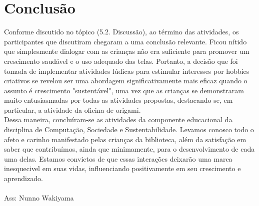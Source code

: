 \documentclass[a4paper,12pt]{article}
\begin{document}
\section{\LARGE{Conclusão}}
Conforme discutido no tópico (5.2. Discussão), ao término das atividades, os participantes que discutiram chegaram a uma conclusão relevante. Ficou nítido que simplesmente dialogar com as crianças não era suficiente para promover um crescimento saudável e o uso adequado das telas. Portanto, a decisão que foi tomada de implementar atividades lúdicas para estimular interesses por hobbies criativos se revelou ser uma abordagem significativamente mais eficaz quando o assunto é crescimento "sustentável", uma vez que as crianças se demonstraram muito entusiasmadas por todas as atividades propostas, destacando-se, em particular, a atividade da oficina de origami.\vspace{0.3cm}\\
Dessa maneira, concluíram-se as atividades da componente educacional da disciplina de Computação, Sociedade e Sustentabilidade. Levamos conosco todo o afeto e carinho manifestado pelas crianças da biblioteca, além da satisfação em saber que contribuímos, ainda que minimamente, para o desenvolvimento de cada uma delas. Estamos convictos de que essas interações deixarão uma marca inesquecivel em suas vidas, influenciando positivamente em seu crescimento e aprendizado.\vspace{0.3cm}\\\\ 

Ass: Nunno Wakiyama
\end{document}
